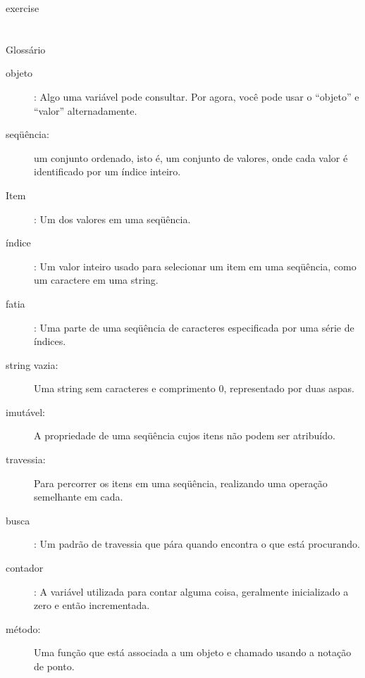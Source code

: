 \documentclass[10pt]{book}
\begin{document}
\begin{exercise}
\begin{}
\end{} exercise



\section{} Glossário

\begin{description}

\item[objeto]: Algo uma variável pode consultar. Por agora,
você pode usar o ``objeto'' e ``valor'' alternadamente.

\item[seqüência:] um conjunto ordenado, isto é, um conjunto de
valores, onde cada valor é identificado por um índice inteiro.

\item[Item]: Um dos valores em uma seqüência.

\item[índice]: Um valor inteiro usado para selecionar um item em
uma seqüência, como um caractere em uma string.

\item[fatia]: Uma parte de uma seqüência de caracteres especificada por uma série de índices.

\item[string vazia:] Uma string sem caracteres e comprimento 0, representado
por duas aspas.

\item[imutável:] A propriedade de uma seqüência cujos itens não podem
ser atribuído.

\item[travessia:] Para percorrer os itens em uma seqüência,
realizando uma operação semelhante em cada.

\item[busca]: Um padrão de travessia que pára
quando encontra o que está procurando.

\item[contador]: A variável utilizada para contar alguma coisa, geralmente inicializado
a zero e então incrementada.

\item[método:] Uma função que está associada a um objeto e chamado
usando a notação de ponto.


\end{description}
\end{exercise}
\end{document}
